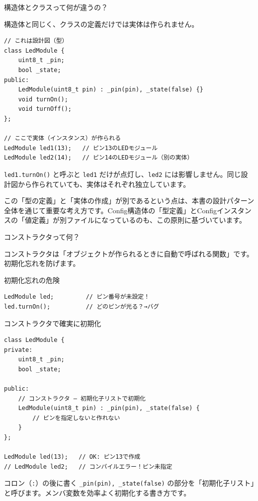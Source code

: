 \begin{qabox}{構造体とクラスって何が違うの？}
\begin{cautionbox}
構造体と同じく、クラスの定義だけでは実体は作られません。

\begin{lstlisting}
// これは設計図（型）
class LedModule {
    uint8_t _pin;
    bool _state;
public:
    LedModule(uint8_t pin) : _pin(pin), _state(false) {}
    void turnOn();
    void turnOff();
};

// ここで実体（インスタンス）が作られる
LedModule led1(13);   // ピン13のLEDモジュール
LedModule led2(14);   // ピン14のLEDモジュール（別の実体）
\end{lstlisting}

\texttt{led1.turnOn()} と呼ぶと \texttt{led1} だけが点灯し、\texttt{led2} には影響しません。同じ設計図から作られていても、実体はそれぞれ独立しています。

この「型の定義」と「実体の作成」が別であるという点は、本書の設計パターン全体を通じて重要な考え方です。Config構造体の「型定義」とConfigインスタンスの「値定義」が別ファイルになっているのも、この原則に基づいています。
\end{cautionbox}

\end{qabox}

\begin{qabox}{コンストラクタって何？}

コンストラクタは「オブジェクトが作られるときに自動で呼ばれる関数」です。初期化忘れを防げます。

\begin{badexample}{初期化忘れの危険}
\begin{lstlisting}
LedModule led;         // ピン番号が未設定！
led.turnOn();          // どのピンが光る？→バグ
\end{lstlisting}
\end{badexample}

\begin{goodexample}{コンストラクタで確実に初期化}
\begin{lstlisting}
class LedModule {
private:
    uint8_t _pin;
    bool _state;

public:
    // コンストラクタ — 初期化子リストで初期化
    LedModule(uint8_t pin) : _pin(pin), _state(false) {
        // ピンを指定しないと作れない
    }
};

LedModule led(13);   // OK: ピン13で作成
// LedModule led2;   // コンパイルエラー！ピン未指定
\end{lstlisting}
\end{goodexample}

コロン（\texttt{:}）の後に書く \texttt{\_pin(pin), \_state(false)} の部分を「初期化子リスト」と呼びます。メンバ変数を効率よく初期化する書き方です。
\end{qabox}

